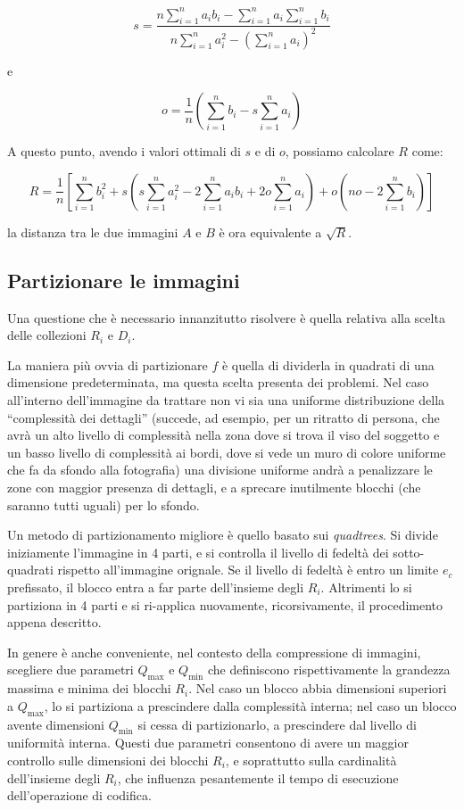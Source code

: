 \documentclass[11pt,a4paper,appendixprefix=true,numbers=noenddot]{scrreprt}
\begin{document}
\[
s = \dfrac{ n \sum\limits_{i=1}^{n}{a_i b_i} - \sum\limits_{i=1}^{n}{a_i} \sum\limits_{i=1}^{n}{b_i} }
{n \sum\limits_{i=1}^{n}{a_i^2} - {\left( \sum\limits_{i=1}^{n}{a_i} \right)}^2 }
\]

e

\[
o = \frac{1}{n} \left( \sum\limits_{i=1}^{n}{b_i} - s \sum\limits_{i=1}^{n}{a_i} \right)
\]

A questo punto, avendo i valori ottimali di $s$ e di $o$, possiamo calcolare $R$ come:

\[
R = \frac{1}{n} \left[ \sum\limits_{i=1}^{n}{b_i^2} 
+ s \left( s \sum\limits_{i=1}^{n}{a_i^2} - 2 \sum\limits_{i=1}^{n}{a_i b_i} + 2o \sum\limits_{i=1}^{n}{a_i}  \right) 
+ o \left( no - 2 \sum\limits_{i=1}^{n}{b_i} \right)  \right]
\]

la distanza tra le due immagini $A$ e $B$ è ora equivalente a $\sqrt{R}$.

\subsection*{Partizionare le immagini}

Una questione che è necessario innanzitutto risolvere è quella relativa alla scelta delle collezioni $R_i$ e $D_i$. 

La maniera più ovvia di partizionare $f$ è quella di dividerla in quadrati di una dimensione predeterminata, ma questa scelta presenta dei problemi. Nel caso all'interno dell'immagine da trattare non vi sia una uniforme distribuzione della ``complessità dei dettagli'' (succede, ad esempio, per un ritratto di persona, che avrà un alto livello di complessità nella zona dove si trova il viso del soggetto e un basso livello di complessità ai bordi, dove si vede un muro di colore uniforme che fa da sfondo alla fotografia) una divisione uniforme andrà a penalizzare le zone con maggior presenza di dettagli, e a sprecare inutilmente blocchi (che saranno tutti uguali) per lo sfondo.

Un metodo di partizionamento migliore è quello basato sui \emph{quadtrees}. Si divide iniziamente l'immagine in 4 parti, e si controlla il livello di fedeltà dei sotto-quadrati rispetto all'immagine orignale. Se il livello di fedeltà è entro un limite $e_c$ prefissato, il blocco entra a far parte dell'insieme degli $R_i$. Altrimenti lo si partiziona in 4 parti e si ri-applica nuovamente, ricorsivamente, il procedimento appena descritto.

In genere è anche conveniente, nel contesto della compressione di immagini, scegliere due parametri $Q_{\text{max}}$ e $Q_{\text{min}}$ che definiscono rispettivamente la grandezza massima e minima dei blocchi $R_i$. Nel caso un blocco abbia dimensioni superiori a $Q_{\text{max}}$, lo si partiziona a prescindere dalla complessità interna; nel caso un blocco avente dimensioni $Q_{\text{min}}$ si cessa di partizionarlo, a prescindere dal livello di uniformità interna. Questi due parametri consentono di avere un maggior controllo sulle dimensioni dei blocchi $R_i$, e soprattutto sulla cardinalità dell'insieme degli $R_i$, che influenza pesantemente il tempo di esecuzione dell'operazione di codifica.
\end{document}
